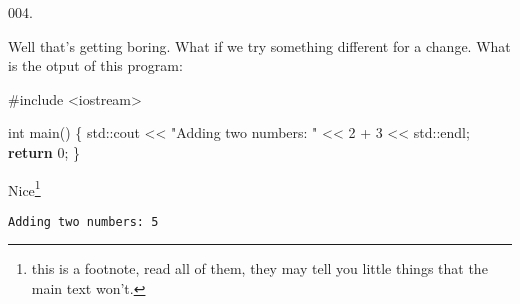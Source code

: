 \documentclass[]{book}
\newenvironment{Shaded}{}{}
\newcommand{\BuiltInTok}[1]{#1}
\newcommand{\ControlFlowTok}[1]{\textcolor[rgb]{0.00,0.44,0.13}{\textbf{#1}}}
\newcommand{\DataTypeTok}[1]{\textcolor[rgb]{0.56,0.13,0.00}{#1}}
\newcommand{\DecValTok}[1]{\textcolor[rgb]{0.25,0.63,0.44}{#1}}
\newcommand{\ImportTok}[1]{#1}
\newcommand{\NormalTok}[1]{#1}
\newcommand{\PreprocessorTok}[1]{\textcolor[rgb]{0.74,0.48,0.00}{#1}}
\newcommand{\StringTok}[1]{\textcolor[rgb]{0.25,0.44,0.63}{#1}}
\begin{document}
\begin{minipage}{\linewidth}\noindent
{\tiny 004.}\\
\begin{minipage}[t]{.485\linewidth}

Well that's getting boring. What if we try something different for a
change. What is the otput of this program:

\begin{framed}

\begin{Shaded}
\begin{Highlighting}[]
\PreprocessorTok{#include }\ImportTok{<iostream>}

\DataTypeTok{int}\NormalTok{ main()}
\NormalTok{\{}
  \BuiltInTok{std::}\NormalTok{cout << }\StringTok{"Adding two numbers: "}
\NormalTok{            << }\DecValTok{2}\NormalTok{ + }\DecValTok{3}
\NormalTok{            << }\BuiltInTok{std::}\NormalTok{endl;}
  \ControlFlowTok{return} \DecValTok{0}\NormalTok{;}
\NormalTok{\}}
\end{Highlighting}
\end{Shaded}

\end{framed}

\end{minipage}
\hfill
\begin{minipage}[t]{.485\linewidth}

Nice\footnote{this is a footnote, read all of them, they may tell you
  little things that the main text won't.}

\begin{framed}

\begin{verbatim}
Adding two numbers: 5
\end{verbatim}

\end{framed}

\end{minipage}
\end{minipage}

\vspace{2mm}\noindent\hrulefill{}
\end{document}
